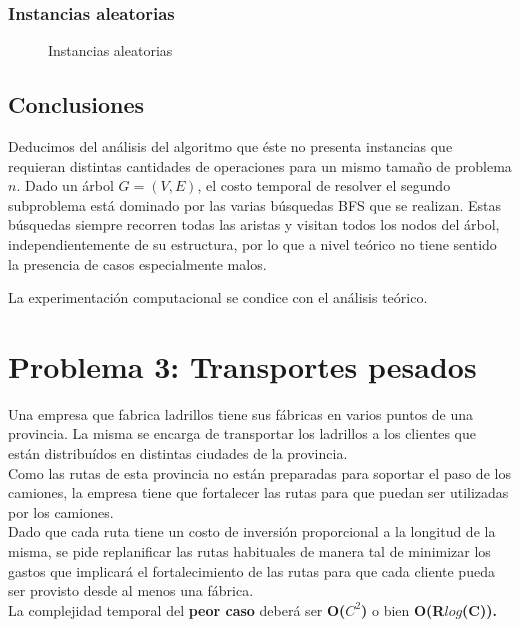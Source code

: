 \documentclass[a4paper, 10pt, twoside]{article}
\newcommand{\dosgraficos}[2]{
    \newcommand{\separacion}{-2.2em}
    \vspace{\separacion}
    
    \vspace{\separacion}
    
}
\begin{document}
\subsubsection{Instancias aleatorias}

\begin{figure}[H]
  \centering
  \dosgraficos{problema2-instancias-aleatorias}
              {problema2-instancias-aleatorias-n}
  \caption{Instancias aleatorias}
\end{figure}

\newpage


\subsection{Conclusiones}

Deducimos del análisis del algoritmo que éste no presenta instancias que requieran distintas cantidades de operaciones para un mismo tamaño de problema $n$. Dado un árbol $G = (V, E)$, el costo temporal de resolver el segundo subproblema está dominado por las varias búsquedas BFS que se realizan. Estas búsquedas siempre recorren todas las aristas y visitan todos los nodos del árbol, independientemente de su estructura, por lo que a nivel teórico no tiene sentido la presencia de casos especialmente malos.

La experimentación computacional se condice con el análisis teórico.




\section{Problema 3: Transportes pesados}

Una empresa que fabrica ladrillos tiene sus fábricas en varios puntos de una provincia. La misma se encarga de transportar los ladrillos a los clientes que están distribuídos en distintas ciudades de la provincia.\\
Como las rutas de esta provincia no están preparadas para soportar el paso de los camiones, la empresa tiene que fortalecer las rutas para que puedan ser utilizadas por los camiones.\\
Dado que cada ruta tiene un costo de inversión proporcional a la longitud de la misma, se pide replanificar las rutas habituales de manera tal de minimizar los gastos que implicará el fortalecimiento de las rutas para que cada cliente pueda ser provisto desde al menos una fábrica.\\
La complejidad temporal del \textbf{peor caso} deberá ser \textbf{O($C^2$)} o bien \textbf{O(R$log$(C)).}
\end{document}
